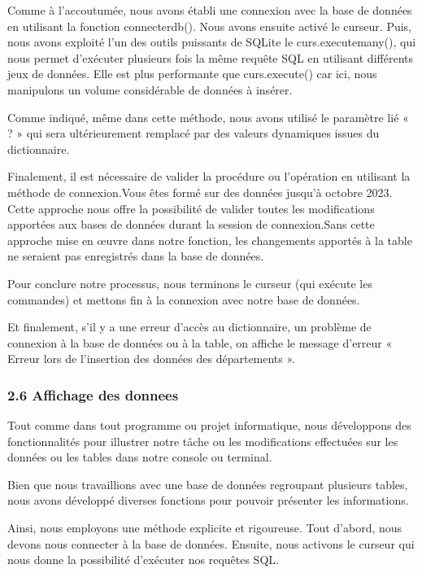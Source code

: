 \documentclass[
]{article}
\begin{document}
Comme à l'accoutumée, nous avons établi une connexion avec la base de
données en utilisant la fonction connecterdb(). Nous avons ensuite
activé le curseur. Puis, nous avons exploité l'un des outils puissants
de SQLite le curs.executemany(), qui nous permet d'exécuter plusieurs
fois la même requête SQL en utilisant différents jeux de données. Elle
est plus performante que curs.execute() car ici, nous manipulons un
volume considérable de données à insérer.

Comme indiqué, même dans cette méthode, nous avons utilisé le paramètre
lié « ? » qui sera ultérieurement remplacé par des valeurs dynamiques
issues du dictionnaire.

Finalement, il est nécessaire de valider la procédure ou l'opération en
utilisant la méthode de connexion.Vous êtes formé sur des données
jusqu'à octobre 2023. Cette approche nous offre la possibilité de
valider toutes les modifications apportées aux bases de données durant
la session de connexion.Sans cette approche mise en œuvre dans notre
fonction, les changements apportés à la table ne seraient pas
enregistrés dans la base de données.

Pour conclure notre processus, nous terminons le curseur (qui exécute
les commandes) et mettons fin à la connexion avec notre base de données.

Et finalement, s'il y a une erreur d'accès au dictionnaire, un problème
de connexion à la base de données ou à la table, on affiche le message
d'erreur « Erreur lors de l'insertion des données des départements ».

\subsubsection{2.6 Affichage des donnees}\label{affichage-des-donnees}

Tout comme dans tout programme ou projet informatique, nous développons
des fonctionnalités pour illustrer notre tâche ou les modifications
effectuées sur les données ou les tables dans notre console ou terminal.

Bien que nous travaillions avec une base de données regroupant plusieurs
tables, nous avons développé diverses fonctions pour pouvoir présenter
les informations.

Ainsi, nous employons une méthode explicite et rigoureuse. Tout d'abord,
nous devons nous connecter à la base de données. Ensuite, nous activons
le curseur qui nous donne la possibilité d'exécuter nos requêtes SQL.
\end{document}

